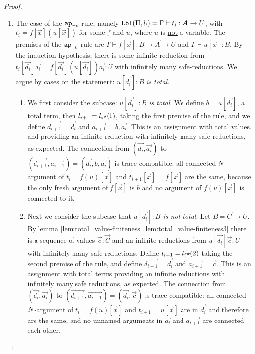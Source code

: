 \begin{proof}
\begin{enumerate}


\item
  The case of the $\apnotvar$-rule, namely 
  $\Label(\Pi,l_i) = \Gamma\vdash t_i: \vec{A}\rightarrow U$, 
  with $t_i = f[\vec{x}](u[\vec{x}])$ for some $f$ and $u$, 
  where $u$ is \underline{not} a variable.
  The premises of the $\apnotvar$-rule
   are $\Gamma\vdash f[\vec{x}]: B \rightarrow \vec{A}\rightarrow U$ 
  and $\Gamma\vdash u[\vec{x}]: B$.
  By the induction hypothesis, there is some infinite reduction from
  $t_i[\vec{d_i}]\vec{a_i} = f[\vec{d_i}](u[\vec{d_i}])\vec{a_i}:U$ 
  with infinitely many safe-reductions.
  We argue by cases on the statement: \emph{$u[\vec{d_i}]:B$ is total}.




\begin{enumerate}
\item
  We first consider the subcase: \emph{$u[\vec{d_i}]:B$ is total}.
  We define $b = u[\vec{d_i}]$, a total term, 
  then $l_{i+1}=l_i {\star} (1)$, taking the first premise of the rule,
  and we define $\vec{d_{i+1}} = \vec{d_i}$ and $\vec{a_{i+1}} = b,\vec{a_i}$. 
  This is an assignment with total values, 
  and providing an infinite reduction with infinitely many safe reductions, as expected. 
  The connection from 
  $(\vec{d_i},\vec{a_i})$ to $(\vec{d_{i+1}},\vec{a_{i+1}}) = (\vec{d_i},b,\vec{a_i})$ 
  is trace-compatible: all connected 
  ${N}$-argument of $t_{i}=f(u)[\vec{x}]$ and $t_{i+1}[\vec{x}] = f[\vec{x}]$ are the same,
  because the only fresh argument of $f[\vec{x}]$ 
  is $b$ and no argument of $f(u)[\vec{x}]$ is connected to it.
\item
  Next we consider the subcase that \emph{$u[\vec{d_i}]:B$ is not total}.
  Let $B = \vec{C}\rightarrow U$.
  By lemma \ref{lem:total_value-finiteness}.\ref{lem:total_value-finiteness3}
  there is a sequence of values $\vec{c}:\vec{C}$ and an infinite reductions from 
  $u[\vec{d_i}]\vec{c}: U$ with infinitely many safe reductions.
  Define $l_{i+1}= l_i {\star} (2)$ taking the second premise of the rule,
  and define $\vec{d_{i+1}} = \vec{d_i}$ and $\vec{a_{i+1}} = \vec{c}$. 
  This is an assignment with total terms providing an infinite reductions with 
  infinitely many safe reductions, as expected.
  The connection from 
  $(\vec{d_i},\vec{a_i})$ to $(\vec{d_{i+1}},\vec{a_{i+1}}) = (\vec{d_i},\vec{c})$ is
  trace compatible: all connected ${N}$-argument of $t_{i} = f(u)[\vec{x}]$ and $t_{i+1}=u[\vec{x}]$ are 
  in $\vec{d_i}$ and therefore are the same, and no unnamed arguments in $\vec{a_i}$
  and $\vec{a_{i+1}}$ are connected each other.
 \end{enumerate}


\end{enumerate}
\end{proof}
